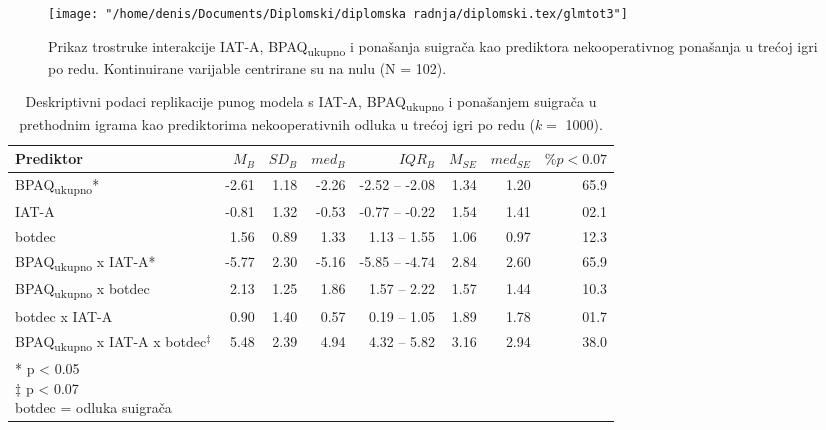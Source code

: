 \documentclass[a4paper, 12pt]{report}
\begin{document}
\begin{figure}[h]
    \begin{center}
        \caption{\label{glmtotgam3plot} Prikaz trostruke interakcije IAT-A,
            BPAQ\textsubscript{ukupno} i ponašanja suigrača kao prediktora
            nekooperativnog ponašanja u trećoj igri po redu. Kontinuirane
            varijable centrirane su na nulu (N = 102).}
        \texttt{[image: "/home/denis/Documents/Diplomski/diplomska
            radnja/diplomski.tex/glmtot3"]}
    \end{center}
\end{figure}

\begin{table}
    \begin{center}
        \caption{\label{deskr gam3 robust} Deskriptivni podaci replikacije punog
            modela s IAT-A, BPAQ\textsubscript{ukupno} i ponašanjem suigrača u
            prethodnim igrama kao prediktorima nekooperativnih odluka u trećoj 
            igri po redu ($k =$ 1000).}
        \hspace*{-0.8cm}\begin{tabular}{lrrrrrrr}
        \toprule
        Prediktor & $M_B$ & $SD_B$ & $med_B$ & $IQR_B$ & $M_{SE}$ & $med_{SE}$
        & $\% p < 0.07$\\
        \midrule
        BPAQ\textsubscript{ukupno}* & -2.61 & 1.18 & -2.26 & -2.52 -- -2.08 &
        1.34 & 1.20 & 65.9\\
       IAT-A & -0.81 & 1.32 & -0.53 & -0.77 -- -0.22& 1.54 & 1.41 & 02.1\\
       botdec & 1.56 & 0.89 & 1.33 & 1.13 -- 1.55 & 1.06 & 0.97 & 12.3\\
       BPAQ\textsubscript{ukupno} x IAT-A* & -5.77 & 2.30 & -5.16 & -5.85 --
       -4.74& 2.84 & 2.60 & 65.9\\
       BPAQ\textsubscript{ukupno} x botdec & 2.13 & 1.25 & 1.86 &
        1.57 -- 2.22 & 1.57 & 1.44 & 10.3\\
       botdec x IAT-A & 0.90 & 1.40 & 0.57 & 0.19 -- 1.05& 1.89 & 1.78 & 01.7\\
       BPAQ\textsubscript{ukupno} x IAT-A x botdec$^\ddagger$ & 5.48 & 2.39 & 4.94 &
        4.32 -- 5.82& 3.16 & 2.94 & 38.0\\
        \bottomrule
        \multicolumn{5}{l}{
            \parbox{3cm}{\scriptsize \vspace{3pt} 
                * p < 0.05\\
                $\ddagger$  p < 0.07\\
                botdec = odluka suigrača
        }}
    \end{tabular}
\end{center}
\end{table}
\end{document}
